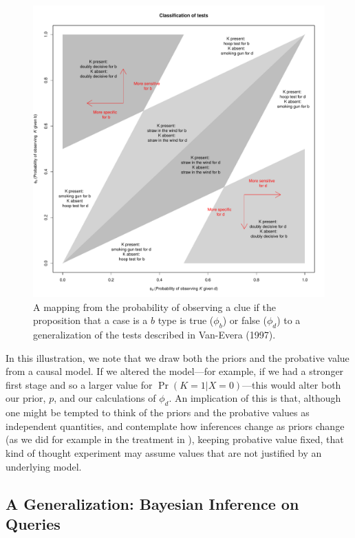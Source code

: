 \documentclass[
  12pt,
]{book}
\begin{document}
\begin{figure}
\centering
\includegraphics{ii_files/figure-latex/cluesinferences-1.pdf}
\caption{\label{fig:cluesinferences}\label{CluesInferences1} A mapping from the probability of observing a clue if the proposition that a case is a \(b\) type is true (\(\phi_b\)) or false (\(\phi_d\)) to a generalization of the tests described in Van-Evera (1997).}
\end{figure}

In this illustration, we note that we draw both the priors and the probative value from a causal model. If we altered the model---for example, if we had a stronger first stage and so a larger value for \(\Pr(K=1|X=0)\)---this would alter both our prior, \(p\), and our calculations of \(\phi_d\). An implication of this is that, although one might be tempted to think of the priors and the probative values as independent quantities, and contemplate how inferences change as priors change (as we did for example in the treatment in \citet{humphreys2015mixing}), keeping probative value fixed, that kind of thought experiment may assume values that are not justified by an underlying model.

\hypertarget{a-generalization-bayesian-inference-on-queries}{%
\subsection{A Generalization: Bayesian Inference on Queries}\label{a-generalization-bayesian-inference-on-queries}}
\end{document}
